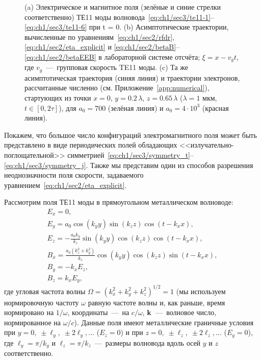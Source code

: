 \begin{figure}[ht]
    \caption[Динамика электрона в поле ТЕ11 моды прямоугольного волновода]{\label{fig:ch1/sec3/te11}
    (a) Электрическое и магнитное поля (зелёные и синие стрелки соответственно) ТЕ11 моды волновода~\eqref{eq:ch1/sec3/te11-1}--\eqref{eq:ch1/sec3/te11-6} при t = 0.
    (b) Асимптотические траектории, вычисленные по уравнениям~\eqref{eq:ch1/sec2/rfdr}, \eqref{eq:ch1/sec2/eta_explicit} и
    \eqref{eq:ch1/sec2/betaB}--\eqref{eq:ch1/sec2/betaEEB} в лабораторной системе отсчёта; $\xi = x - v_g t$, где
    $v_g$~---~групповая скорость TE11 моды.
    (c) Та же асимптотическая траектория (синяя линия) и траектории электронов, рассчитанные численно (см. Приложение~\ref{app:numerical}), стартующих из точки $x = 0$, $y = 0.2 \, \lambda$, $z = 0.65 \, \lambda$ ($\lambda = 1$ мкм, $t \in [0, 2 \tau]$), для $a_0 = 700$ (зелёная линия) и $a_0 = 4 \cdot 10^3$ (красная линия).}
\end{figure}

Покажем, что большое число конфигураций электромагнитного поля может быть представлено в виде периодических полей обладающих <<излучательно-поглощательной>> симметрией~\eqref{eq:ch1/sec3/symmetry_t}--\eqref{eq:ch1/sec3/symmetry_j}. Также мы представим один из способов разрешения неоднозначности поля скорости, задаваемого уравнением~\eqref{eq:ch1/sec2/eta_explicit}.

Рассмотрим поля ТЕ11 моды в прямоугольном металлическом волноводе:
\begin{eqnarray}
    \label{eq:ch1/sec3/te11-1}
    E_x = 0, \\
    \label{eq:ch1/sec3/te11-2}
    E_y = a_0 \cos(k_y y) \sin(k_z z) \cos(t - k_x x), \\
    \label{eq:ch1/sec3/te11-3}
    E_z = -\frac{a_0 k_y}{k_z} \sin(k_y y) \cos(k_z z) \cos(t - k_x x), \\
    \label{eq:ch1/sec3/te11-4}
    B_x = \frac{a_0 (k_z^2 + k_y^2)}{k_z} \cos(k_y y) \cos(k_z z) \sin(t - k_x x), \\
    \label{eq:ch1/sec3/te11-5}
    B_y = -k_x E_z, \\
    \label{eq:ch1/sec3/te11-6}
    B_z = k_x E_y,
\end{eqnarray}
где угловая частота волны $\Omega = (k_x^2 + k_y^2 + k_z^2)^{1/2}= 1$ (мы используем нормировочную частоту $\omega$ равную частоте волны и, как раньше, время нормировано на $1/\omega$, координаты~---~на $c / \omega$, $\vb k$~---~волновое число, нормированное на $\omega / c$).
Данные поля имеют металлические граничные условия при ${y = 0, \; \pm \ell_y, \; \pm 2 \ell_y,...}$ ($E_z = 0$) и при ${z = 0, \; \pm \ell_z, \; \pm 2 \ell_z,...}$ ($E_y = 0$), где $\ell_y = \pi / k_y$ и $\ell_z = \pi / k_z$~---~размеры волновода вдоль осей $y$ и $z$ соответственно.

